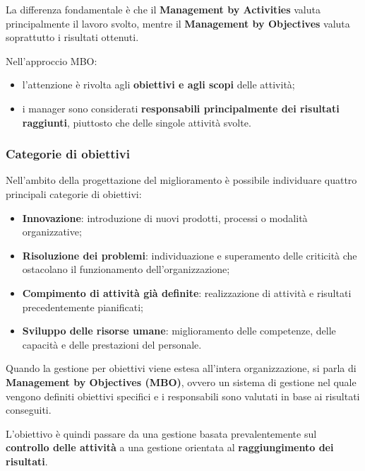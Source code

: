 \noindent La differenza fondamentale è che il \textbf{Management by Activities} valuta principalmente il lavoro svolto, mentre il \textbf{Management by Objectives} valuta soprattutto i risultati ottenuti.

\medskip

\noindent Nell'approccio MBO:

\begin{itemize}
    \item l'attenzione è rivolta agli \textbf{obiettivi e agli scopi} delle attività;
    
    \item i manager sono considerati \textbf{responsabili principalmente dei risultati raggiunti}, piuttosto che delle singole attività svolte.
\end{itemize}

\subsubsection*{Categorie di obiettivi}

\noindent Nell'ambito della progettazione del miglioramento è possibile individuare quattro principali categorie di obiettivi:

\begin{itemize}
    \item \textbf{Innovazione}: introduzione di nuovi prodotti, processi o modalità organizzative;

    \item \textbf{Risoluzione dei problemi}: individuazione e superamento delle criticità che ostacolano il funzionamento dell'organizzazione;

    \item \textbf{Compimento di attività già definite}: realizzazione di attività e risultati precedentemente pianificati;

    \item \textbf{Sviluppo delle risorse umane}: miglioramento delle competenze, delle capacità e delle prestazioni del personale.
\end{itemize}

\noindent Quando la gestione per obiettivi viene estesa all'intera organizzazione, si parla di \textbf{Management by Objectives (MBO)}, ovvero un sistema di gestione nel quale vengono 
definiti obiettivi specifici e i responsabili sono valutati in base ai risultati conseguiti.

\medskip

\noindent L'obiettivo è quindi passare da una gestione basata prevalentemente sul \textbf{controllo delle attività} a una gestione orientata al \textbf{raggiungimento dei risultati}.

